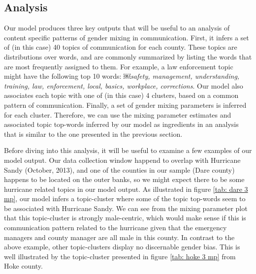 \documentclass{pnastwo}
\begin{document}
\begin{article}
\subsection{Analysis}
Our model produces three key outputs that will be useful to an analysis of content specific patterns of gender mixing in communication. First, it infers a set of (in this case) 40 topics of communication for each county. These topics are distributions over words, and are commonly summarized by listing the words that are most frequently assigned to them. For example, a law enforcement topic might have the following top 10 words:
￼\emph{safety, management, understanding, training, law, enforcement, local, basics, workplace, corrections}. Our model also associates each topic with one of (in this case) 4 clusters, based on a common pattern of communication. Finally, a set of gender mixing parameters is inferred for each cluster. Therefore, we can use the mixing parameter estimates and associated topic top-words inferred by our model as ingredients in an analysis that is similar to the one presented in the previous section.

Before diving into this analysis, it will be useful to examine a few examples of our model output. Our data collection window happend to overlap with Hurricane Sandy (October, 2013), and one of the counties in our sample (Dare county) happens to be located on the outer banks, so we might expect there to be some hurricane related topics in our model output. As illustrated in figure \ref{tab: dare 3 mp}, our model infers a topic-cluster where some of the topic top-words seem to be associated with Hurricane Sandy. We can see from the mixing parameter plot that this topic-cluster is strongly male-centric, which would make sense if this is communication pattern related to the hurricane given that the emergency managers and county manager are all male in this county. In contrast to the above example, other topic-clusters display no discernable gender bias. This is well illustrated by the topic-cluster presented in figure \ref{tab: hoke 3 mp} from Hoke county.


\end{article}
\end{document}
